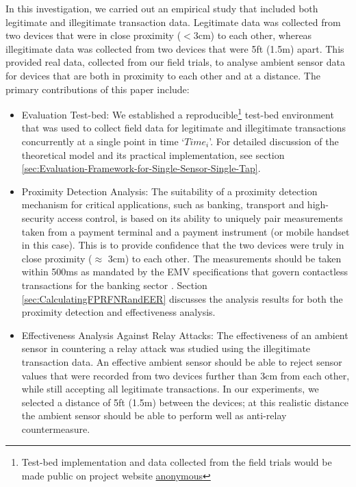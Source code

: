 \documentclass[runningheads,a4paper]{llncs}
\begin{document}
In this investigation, we carried out an empirical study that included both legitimate and illegitimate transaction data. Legitimate data was collected from two devices that were in close proximity ($<$3cm) to each other, whereas illegitimate data was collected from two devices that were 5ft (1.5m) apart. This provided real data, collected from our field trials, to analyse ambient sensor data for devices that are both in proximity to each other and at a distance.  The primary contributions of this paper include:
\begin{itemize}
\item{Evaluation Test-bed:} We established a reproducible\footnote{Test-bed implementation and data collected from the field trials would be made public on project website \url{anonymous}} test-bed environment that was used to collect field data for legitimate and illegitimate transactions concurrently at a single point in time `$Time_i$'. For detailed discussion of the theoretical model and its practical implementation, see section \ref{sec:Evaluation-Framework-for-Single-Sensor-Single-Tap}.
\item{Proximity Detection Analysis:}
The suitability of a proximity detection mechanism for critical applications, such as banking, transport and high-security access control, is based on its ability to uniquely pair measurements taken from a payment terminal and a payment instrument (or mobile handset in this case). This is to provide confidence that the two devices were truly in close proximity ($\approx$ 3cm) to each other. The measurements should be taken within 500ms as mandated by the EMV specifications that govern contactless transactions for the banking sector \cite{VISAMobileTicketing2013,MasterCard2014,MasterCardTaB,EVM2015-ContactlessArchitectureReq,VISA-TADG}. Section \ref{sec:CalculatingFPRFNRandEER} discusses the analysis results for both the proximity detection and effectiveness analysis. 
\item{Effectiveness Analysis Against Relay Attacks:}
The effectiveness of an ambient sensor in countering a relay attack was studied using the illegitimate transaction data. An effective ambient sensor should be able to reject sensor values that were recorded from two devices further than 3cm from each other, while still accepting all legitimate transactions. In our experiments, we selected a distance of 5ft (1.5m) between the devices; at this realistic distance the ambient sensor should be able to perform well as anti-relay countermeasure. 
\end{itemize}
\end{document}

